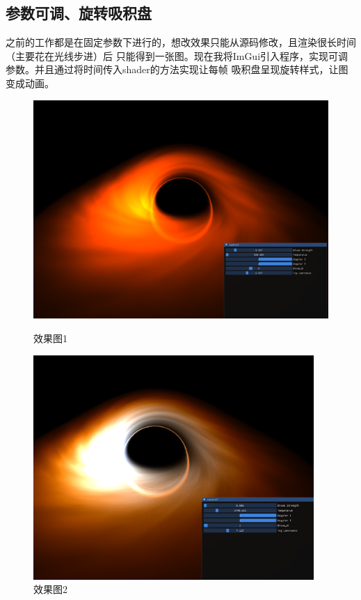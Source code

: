 \documentclass[a4paper, 12pt]{article}
\begin{document}
    \subsection{参数可调、旋转吸积盘}
    之前的工作都是在固定参数下进行的，想改效果只能从源码修改，且渲染很长时间（主要花在光线步进）后
    只能得到一张图。现在我将ImGui引入程序，实现可调参数。并且通过将时间传入shader的方法实现让每帧
    吸积盘呈现旋转样式，让图变成动画。
    \begin{figure}[H]
        \centering
        \begin{minipage}[t]{0.48\textwidth}
            \centering
            \includegraphics[width=1.03\textwidth]{photo/swz1.png}
            \caption{效果图1}
        \end{minipage}
        \hfill
        \begin{minipage}[t]{0.48\textwidth}
            \centering
            \includegraphics[width=0.95\textwidth]{photo/swz0.png}
            \caption{效果图2}
        \end{minipage}
    \end{figure}
\end{document}
